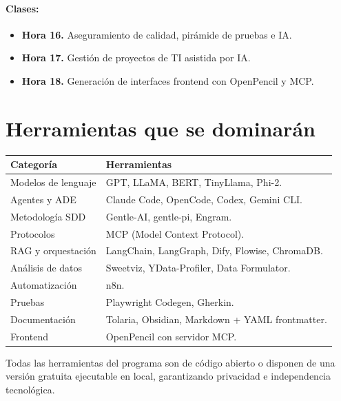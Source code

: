 \documentclass[11pt,a4paper]{article}
\renewcommand{\arraystretch}{1.25}
\begin{document}
\paragraph{Clases:}
\begin{itemize}
  \item \textbf{Hora 16.} Aseguramiento de calidad, pirámide de pruebas e IA.
  \item \textbf{Hora 17.} Gestión de proyectos de TI asistida por IA.
  \item \textbf{Hora 18.} Generación de interfaces frontend con OpenPencil y MCP.
\end{itemize}

\section{Herramientas que se dominarán}

\begin{table}[h]
  \centering
  \small
  \renewcommand{\arraystretch}{1.3}
  \begin{tabularx}{\linewidth}{Y Y}
    \toprule
    \color{white}\textbf{Categoría} & \color{white}\textbf{Herramientas} \\
    \midrule
    Modelos de lenguaje & GPT, LLaMA, BERT, TinyLlama, Phi-2. \\
    Agentes y ADE & Claude Code, OpenCode, Codex, Gemini CLI. \\
    Metodología SDD & Gentle-AI, gentle-pi, Engram. \\
    Protocolos & MCP (Model Context Protocol). \\
    RAG y orquestación & LangChain, LangGraph, Dify, Flowise, ChromaDB. \\
    Análisis de datos & Sweetviz, YData-Profiler, Data Formulator. \\
    Automatización & n8n. \\
    Pruebas & Playwright Codegen, Gherkin. \\
    Documentación & Tolaria, Obsidian, Markdown + YAML frontmatter. \\
    Frontend & OpenPencil con servidor MCP. \\
    \bottomrule
  \end{tabularx}
\end{table}

\begin{cajanota}
Todas las herramientas del programa son de código abierto o disponen de una versión gratuita ejecutable en local, garantizando privacidad e independencia tecnológica.
\end{cajanota}
\end{document}
